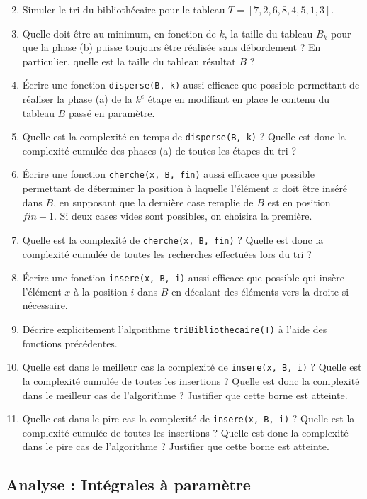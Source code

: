 \documentclass{article}
\begin{document}
\begin{enumerate}
    \setcounter{enumi}{1}
    \item Simuler le tri du bibliothécaire pour le tableau $T = [7, 2, 6, 8, 4, 5, 1, 3]$.
    \item Quelle doit être au minimum, en fonction de $k$, la taille du tableau $B_k$ pour que la phase (b) puisse toujours être réalisée sans débordement ? En particulier, quelle est la taille du tableau résultat $B$ ?
    \item Écrire une fonction \texttt{disperse(B, k)} aussi efficace que possible permettant de réaliser la phase (a) de la $k^e$ étape en modifiant en place le contenu du tableau $B$ passé en paramètre.
    \item Quelle est la complexité en temps de \texttt{disperse(B, k)} ? Quelle est donc la complexité cumulée des phases (a) de toutes les étapes du tri ?
    \item Écrire une fonction \texttt{cherche(x, B, fin)} aussi efficace que possible permettant de déterminer la position à laquelle l'élément $x$ doit être inséré dans $B$, en supposant que la dernière case remplie de $B$ est en position $fin-1$. Si deux cases vides sont possibles, on choisira la première.
    \item Quelle est la complexité de \texttt{cherche(x, B, fin)} ? Quelle est donc la complexité cumulée de toutes les recherches effectuées lors du tri ?
    \item Écrire une fonction \texttt{insere(x, B, i)} aussi efficace que possible qui insère l'élément $x$ à la position $i$ dans $B$ en décalant des éléments vers la droite si nécessaire.
    \item Décrire explicitement l'algorithme \texttt{triBibliothecaire(T)} à l'aide des fonctions précédentes.
    \item Quelle est dans le meilleur cas la complexité de \texttt{insere(x, B, i)} ? Quelle est la complexité cumulée de toutes les insertions ? Quelle est donc la complexité dans le meilleur cas de l'algorithme ? Justifier que cette borne est atteinte.
    \item Quelle est dans le pire cas la complexité de \texttt{insere(x, B, i)} ? Quelle est la complexité cumulée de toutes les insertions ? Quelle est donc la complexité dans le pire cas de l'algorithme ? Justifier que cette borne est atteinte.
\end{enumerate}
    \subsection{Analyse : Intégrales à paramètre}
\end{document}
